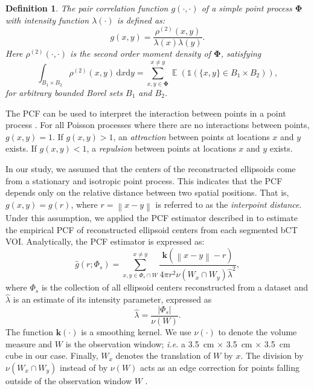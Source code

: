 \documentclass[journal]{IEEEtran}
\DeclareMathOperator{\E}{\mathbb{E}}%
\newcommand{\dd}[1]{\mathrm{d}#1}%
\newcommand{\norm}[1]{\left\lVert#1\right\rVert}%
\newtheorem{define}{Definition}[section]%
\begin{document}
\begin{define}

  The pair correlation function \textit{$g(\cdot, \cdot)$} of a simple
  point process $\mathbf{\Phi}$ with intensity function
  $\lambda(\cdot)$ is defined as:
  \begin{equation}
    \label{eq:pcf-official-def}
    g(x,y)=\frac{\rho^{(2)}(x,y)}{\lambda(x) \lambda(y)}.
  \end{equation}
  Here $\rho^{(2)}(\cdot, \cdot)$ is the second order moment density
  of $\mathbf{\Phi}$, satisfying
  \begin{equation}
    \label{eq:second-order-moment}
    \int_{B_{1} \times B_{2}} \rho^{(2)}(x,y) \, \dd x \dd y
    = \sum^{x \neq y}_{x,y \in \mathbf{\Phi}} \E \left( \mathds{1} (
      \{x,y \} \in B_{1} \times B_{2} ) \right),
  \end{equation}
  for arbitrary bounded Borel sets $B_1$ and $B_2$.
\end{define}

The PCF can be used to interpret the interaction between points in a
point process \cite{illian2008statistical}. For all Poisson processes
where there are no interactions between points, $g(x,y)=1$. If
$g(x,y)>1$, an \textit{attraction} between points at locations $x$ and
$y$ exists. If $g(x,y)<1$, a \textit{repulsion} between points at
locations $x$ and $y$ exists.

In our study, we assumed that the centers of the reconstructed
ellipsoids come from a stationary and isotropic point process. This
indicates that the PCF depends only on the relative distance between
two spatial positions. That is, $g(x, y) = g(r)$, where
$r = \norm{x-y}$ is referred to as the \textit{interpoint
  distance}. Under this assumption, we applied the PCF estimator
described in \cite[p232]{illian2008statistical} to estimate the
empirical PCF of reconstructed ellipsoid centers from each segmented
bCT VOI. Analytically, the PCF estimator is expressed as:
\begin{equation}
  \label{eq:pcf-estimator}
  \hat{g}(r; \Phi_s) = \sum^{x \neq y}_{x, y \in \Phi_s \cap W}
  \frac{\mathbf{k}(\norm{x-y} - r)}
  {4 \pi r^2 \nu(W_x \cap W_y) \hat{\lambda}^2},
\end{equation}
where $\Phi_s$ is the collection of all ellipsoid centers
reconstructed from a dataset and $\hat{\lambda}$ is an estimate of its
intensity parameter, expressed as
\begin{equation}
  \label{eq:inten-estimtor}
  \hat{\lambda} = \frac{|\Phi_s|}{\nu(W)}.
\end{equation}
The function $\mathbf{k}(\cdot)$ is a smoothing kernel. We use
$\nu(\cdot)$ to denote the volume measure and $W$ is the observation
window; \textit{i.e.} a \SI{3.5}{\cm} $\times$ \SI{3.5}{\cm} $\times$
\SI{3.5}{\cm} cube in our case. Finally, $W_x$ denotes the translation
of $W$ by $x$. The division by $\nu(W_x \cap W_y)$ instead of by
$\nu(W)$ acts as an edge correction for points falling outside of the
observation window $W$ \cite{ohser1983estimators}.
\end{document}
